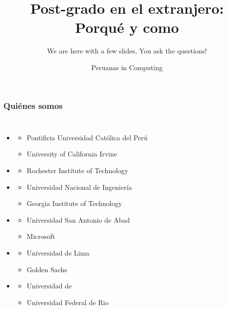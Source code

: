 \documentclass[10pt]{beamer}
\author{Peruanas in Computing}
\title{Post-grado en el extranjero: Porqué y como}
\subtitle{We are here with a few slides, You ask the questions!}
\begin{document}
\maketitle

\begin{frame}

\frametitle{Quiénes somos}
\begin{columns}[t]
\begin{itemize}
\item{{\color{blue}{Rosalva Gallardo Valencia}}
\begin{itemize}
  \item{Pontificia Universidad Católica del Perú}
  \item{University of California Irvine}
\end{itemize}
}
\item{{\color{blue}{Meridangela Gutiérrez Jhong}}
\begin{itemize}
  \item{Rochester Institute of Technology}
\end{itemize}
}
\item{{\color{blue}{Ana Huamán Quispe}}
\begin{itemize}
  \item{Universidad Nacional de Ingeniería}
  \item{Georgia Institute of Technology}
\end{itemize}
}
\item{{\color{magenta}{Rosa Enciso (Skype)}}
\begin{itemize}
  \item{Universidad San Antonio de Abad}
  \item{Microsoft}
\end{itemize}
}
\item{{\color{magenta}{Natalie Gil (Skype)}}
\begin{itemize}
  \item{Universidad de Lima}
  \item{Golden Sachs}  
\end{itemize}
}
\item{{\color{magenta}{Yesenia Yari (Skype)}}
\begin{itemize}
  \item{Universidad de }
  \item{Universidad Federal de Rio}  
\end{itemize}
}
\end{itemize}

\end{columns}
\end{frame}
\end{document}
